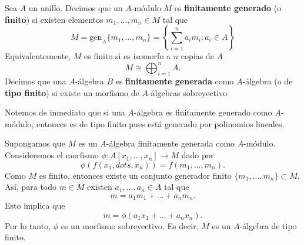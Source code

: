 \begin{definition}
    Sea $A$ un anillo. Decimos que un $A$-módulo $M$ es \textbf{finitamente generado} (o \textbf{finito}) si existen elementos $m_1,\dots,m_n\in M$ tal que
    \begin{equation*}
        M=\mathrm{gen}_A\{m_1,\dots,m_n\}=\left\{\sum_{i=1}^n a_im_i: a_i\in A \right\}
    \end{equation*}
    Equivalentemente, $M$ es finito si es isomorfo a $n$ copias de $A$
    \begin{equation*}
    	M\cong\bigoplus_{i=1}^n A.
    \end{equation*}
    Decimos que una $A$-álgebra $B$ es \textbf{finitamente generada} como $A$-álgebra (o de \textbf{tipo finito}) si existe un morfismo de $A$-álgebras sobreyectivo
    \begin{center}
    \end{center}
    
\end{definition}


    Notemos de inmediato que si una $A$-álgebra es finitamente generado como $A$-módulo, entonces es de tipo finito pues está generado por polinomios lineales.
    
    \begin{example}
    	Supongamos que $M$ es un $A$-álgebra finitamente generada como $A$-módulo. Consideremos el morfismo $\phi:A[x_1,\dots,x_n]\to M$ dado por
    	\begin{equation*}
    		\phi(f(x_1,dots,x_n))=f(m_1,\dots,m_n).
    	\end{equation*}
    	Como $M$ es finito, entonces existe un conjunto generador finito $\{m_1,\dots,m_n\}\subset M$. Así, para todo $m\in M$ existen $a_1,\dots,a_n\in A$ tal que
    	\begin{equation*}
    		m=a_1m_1+\dots+a_nm_n.
    	\end{equation*} 
    	Esto implica que 
    	\begin{equation*}
    		m=\phi(a_1x_1+\dots+a_nx_n).
    	\end{equation*}
    	Por lo tanto, $\phi$ es un morfismo sobreyectivo. Es decir, $M$ es un $A$-álgebra de tipo finito.
    \end{example}
    
